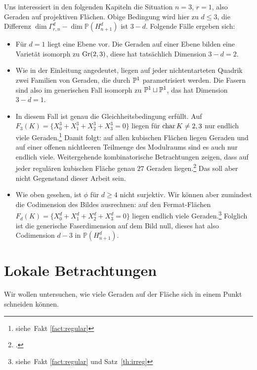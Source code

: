 Uns interessiert in den folgenden Kapiteln die Situation $n=3$, $r=1$, also Geraden auf projektiven Flächen. Obige Bedingung wird hier zu $d \leq 3$, die Differenz $\dim \Gamma_{r,n}^d - \dim \mathbb P(H_{n+1}^d)$ ist $3-d$. Folgende Fälle ergeben sich:
\begin{itemize}
\item Für $d=1$ liegt eine Ebene vor. Die Geraden auf einer Ebene bilden eine Varietät isomorph zu $\grass 2/3$, diese hat tatsächlich Dimension $3-d = 2$.
\item Wie in der Einleitung angedeutet, liegen auf jeder nichtentarteten Quadrik zwei Familien von Geraden, die durch $\mathbb P^{1}$ parametrisiert werden. Die Fasern sind also im generischen Fall isomorph zu $\mathbb P^{1} \sqcup \mathbb P^{1}$, das hat Dimension $3-d = 1$.
\item In diesem Fall ist genau die Gleichheitsbedingung erfüllt. Auf $F_3(K) = \{X_0^3 + X_1^3 + X_2^3 + X_3^3 = 0\}$ liegen für $\operatorname{char} K \neq 2,3$ nur endlich viele Geraden.\footnote{siehe~Fakt \ref{fact:regular}} Damit folgt: auf allen kubischen Flächen liegen Geraden und auf einer offenen nichtleeren Teilmenge des Modulraums sind es auch nur endlich viele. Weitergehende kombinatorische Betrachtungen zeigen, dass auf jeder regulären kubischen Fläche genau $27$ Geraden liegen.\footcite[siehe etwa][]{Henderson} Das soll aber nicht Gegenstand dieser Arbeit sein.
\item Wie oben gesehen, ist $\phi$ für $d \geq 4$ nicht surjektiv. Wir können aber zumindest die Codimension des Bildes ausrechnen: auf den Fermat-Flächen $F_d(K) = \{X_0^d + X_1^d + X_2^d + X_3^d = 0\}$ liegen endlich viele Geraden.\footnote{siehe~Fakt \ref{fact:regular} und Satz~\ref{th:irreg}} Folglich ist die generische Faserdimension auf dem Bild null, dieses hat also Codimension $d-3$ in $\mathbb P(H_{n+1}^d)$.
\end{itemize}

\section{Lokale Betrachtungen}
Wir wollen untersuchen, wie viele Geraden auf der Fläche sich in einem Punkt schneiden können.

